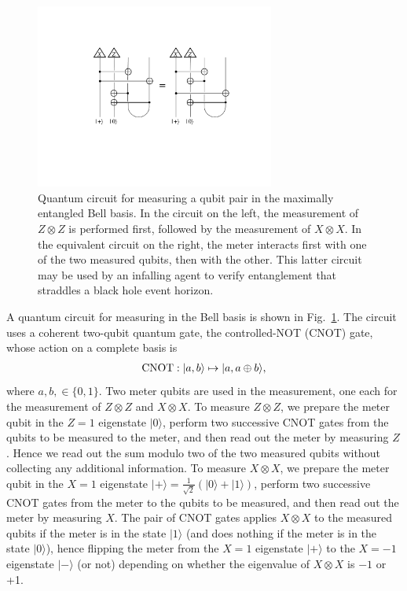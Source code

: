 \documentclass[11pt]{article}
\begin{document}
\begin{figure}[t]
\begin{center}
\includegraphics[width=0.7\textwidth]{bell-meas.pdf}
\end{center}
\caption{Quantum circuit for measuring a qubit pair in the maximally entangled Bell basis. In the circuit on the left, the measurement of $Z\otimes Z$ is performed first, followed by the measurement of $X\otimes X$. In the equivalent circuit on the right, the meter interacts first with one of the two measured qubits, then with the other. This latter circuit may be used by an infalling agent to verify entanglement that straddles a black hole event horizon.}
\label{fig:bell-meas}
\end{figure}


A quantum circuit for measuring in the Bell basis is shown in Fig.~\ref{fig:bell-meas}. The circuit uses a coherent two-qubit quantum gate, the controlled-NOT (CNOT) gate, whose action on a complete basis is
\begin{eqnarray}
{\rm CNOT}: |a, b\rangle \mapsto |a, a\oplus b\rangle,
\end{eqnarray}
where $a,b, \in \{0,1\}$. Two meter qubits are used in the measurement, one each for the measurement of $Z\otimes Z$ and $X\otimes X$. To measure $Z\otimes Z$, we prepare the meter qubit in the $Z=1$ eigenstate $|0\rangle$, perform two successive CNOT gates from the qubits to be measured to the meter, and then read out the meter by measuring $Z$. Hence we read out the sum modulo two of the two measured qubits without collecting any additional information. To measure $X\otimes X$, we prepare the meter qubit in the $X=1$ eigenstate $|+\rangle = \frac{1}{\sqrt{2}}\left(|0\rangle + |1\rangle\right)$, perform two successive CNOT gates from the meter to the qubits to be measured, and then read out the meter by measuring $X$. The pair of CNOT gates applies $X\otimes X$ to the measured qubits if the meter is in the state $|1\rangle$ (and does nothing if the meter is in the state $|0\rangle$), hence flipping the meter from the $X=1$ eigenstate $|+\rangle$ to the $X=-1$ eigenstate $|-\rangle$ (or not) depending on whether the eigenvalue of $X\otimes X$ is $-1$ or +1.
\end{document}
